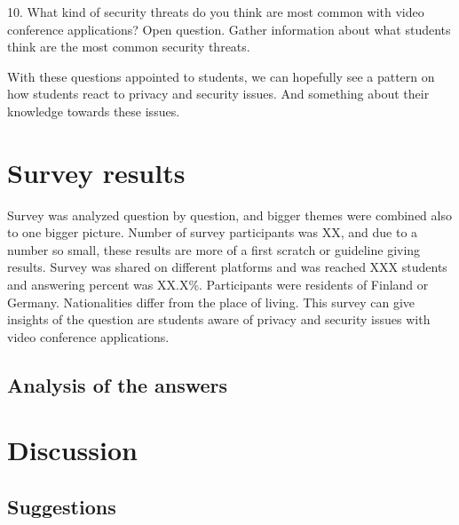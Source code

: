 \documentclass[utf8,english]{gradu3}
\begin{document}
10. What kind of security threats do you think are most common with video conference applications? Open question. Gather information about what students think are the most common security threats.

With these questions appointed to students, we can hopefully see a pattern on how students react to privacy and security issues. And something about their knowledge towards these issues. 

\chapter{Survey results}
\label{surveyresults}
Survey was analyzed question by question, and bigger themes were combined also to one bigger picture. Number of survey participants was XX, and due to a number so small, these results are more of a first scratch or guideline giving results. Survey was shared on different platforms and was reached XXX students and answering percent was XX.X\%. Participants were residents of Finland or Germany. Nationalities differ from the place of living. This survey can give insights of the question are students aware of privacy and security issues with video conference applications.

\section{Analysis of the answers}


\chapter{Discussion}
\label{discussion}

\section{Suggestions}


%
%
%


\end{document}
